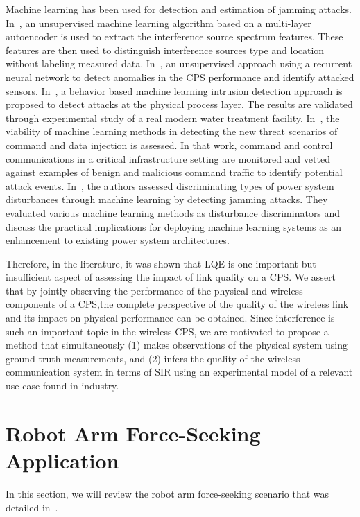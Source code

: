 Machine learning has been used for detection and estimation of jamming attacks. In~\cite{Chen2019}, an unsupervised machine learning algorithm based on a multi-layer autoencoder is used to extract the interference source spectrum features. These features are then used to distinguish interference sources type and location without labeling measured data. In~\cite{7911887},  an unsupervised approach using a recurrent neural network to detect anomalies in the CPS performance and identify attacked sensors. In~\cite{Junejo2016DataDP}, a behavior based machine learning intrusion detection approach  is proposed to detect attacks at the physical process layer. The results are validated through experimental study of a real modern water treatment facility. In~\cite{Beaver:2013:EML:2584691.2584722}, the viability of machine learning methods in detecting the new threat scenarios of command and data injection is assessed. In that work, command and control communications in a critical infrastructure setting are monitored and vetted against examples of benign and malicious command traffic to identify potential attack events. In~\cite{6900095}, the authors assessed discriminating types of power system disturbances through machine learning by detecting jamming attacks. They evaluated various machine learning methods as disturbance discriminators and discuss the practical implications for deploying machine learning systems as an enhancement to existing power system architectures.

Therefore, in the literature, it was shown that LQE is one important but insufficient aspect of assessing the impact of link quality on a CPS. We assert that by jointly observing the performance of the physical and wireless components of a CPS,the complete perspective of the quality of the wireless link and its impact on physical performance can be obtained. Since interference is such an important topic in the wireless CPS, we are motivated to propose a method that simultaneously (1) makes observations of the physical system using ground truth measurements, and (2) infers the quality of the wireless communication system in terms of SIR using an experimental model of a relevant use case found in industry.
    
\section{Robot Arm Force-Seeking Application}\label{sec:ftseekerapp}
In this section, we will review the robot arm force-seeking scenario that was detailed in~\cite{Candell_ISIT_2019}.

